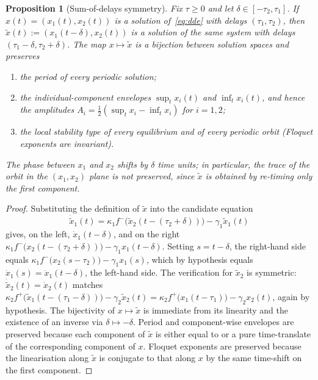 \documentclass[sn-mathphys,Numbered]{sn-jnl}
\theoremstyle{thmstyleone}
\newtheorem{proposition}[theorem]{Proposition}
\theoremstyle{thmstyletwo}
\theoremstyle{thmstylethree}
\begin{document}
\begin{proposition}[Sum-of-delays symmetry]
\label{prop:sum_symmetry}
Fix $\tau\geq 0$ and let $\delta\in[-\tau_2,\tau_1]$. If
$x(t)=(x_1(t),x_2(t))$ is a solution of~\eqref{eq:dde} with delays
$(\tau_1,\tau_2)$, then $\tilde{x}(t):=(x_1(t-\delta),x_2(t))$
is a solution of the same system with delays
$(\tau_1-\delta,\tau_2+\delta)$. The map $x\mapsto\tilde{x}$ is a
bijection between solution spaces and preserves
\begin{enumerate}
  \item the period of every periodic solution;
  \item the individual-component envelopes $\sup_t x_i(t)$ and
        $\inf_t x_i(t)$, and hence the amplitudes
        $A_i = \tfrac{1}{2}(\sup_t x_i-\inf_t x_i)$ for $i=1,2$;
  \item the local stability type of every equilibrium and of every
        periodic orbit (Floquet exponents are invariant).
\end{enumerate}
The phase between $x_1$ and $x_2$ shifts by $\delta$ time units; in
particular, the trace of the orbit in the $(x_1,x_2)$ plane is
\emph{not} preserved, since $\tilde{x}$ is obtained by re-timing only
the first component.
\end{proposition}
\begin{proof}
Substituting the definition of $\tilde{x}$ into the candidate equation
\[
\dot{\tilde{x}}_1(t) = \kappa_1 f^-\!\bigl(\tilde{x}_2(t-(\tau_2+\delta))\bigr) - \gamma_1 \tilde{x}_1(t)
\]
gives, on the left,
$\dot{x}_1(t-\delta)$, and on the right
$\kappa_1 f^-\!\bigl(x_2(t-(\tau_2+\delta))\bigr) - \gamma_1 x_1(t-\delta)$.
Setting $s = t-\delta$, the right-hand side equals
$\kappa_1 f^-\!\bigl(x_2(s-\tau_2)\bigr) - \gamma_1 x_1(s)$, which by
hypothesis equals $\dot{x}_1(s)=\dot{x}_1(t-\delta)$, the left-hand
side. The verification for $\tilde{x}_2$ is symmetric:
$\dot{\tilde{x}}_2(t)=\dot{x}_2(t)$ matches
$\kappa_2 f^+\!\bigl(\tilde{x}_1(t-(\tau_1-\delta))\bigr)-\gamma_2\tilde{x}_2(t)
=\kappa_2 f^+\!\bigl(x_1(t-\tau_1)\bigr)-\gamma_2 x_2(t)$, again by
hypothesis. The bijectivity of $x\mapsto\tilde{x}$ is immediate from its
linearity and the existence of an inverse via $\delta\mapsto-\delta$.
Period and component-wise envelopes are preserved because each
component of $\tilde{x}$ is either equal to or a pure time-translate of
the corresponding component of $x$. Floquet exponents are preserved
because the linearisation along $\tilde{x}$ is conjugate to that along
$x$ by the same time-shift on the first component.
\end{proof}
\end{document}
